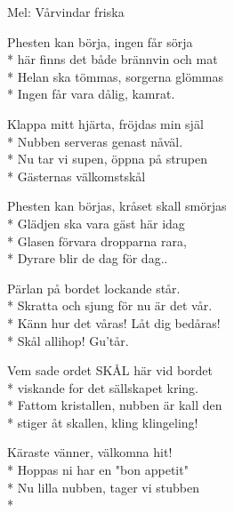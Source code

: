 \begin{SongText}
    \begin{SongInfo}
        Mel: Vårvindar friska
    \end{SongInfo}
    \begin{SongVerse}
        Phesten kan börja, ingen får sörja\\*%
        här finns det både brännvin och mat\\*%
        Helan ska tömmas, sorgerna glömmas\\*%
        Ingen får vara dålig, kamrat.
    \end{SongVerse}
    \begin{SongVerse}
        Klappa mitt hjärta, fröjdas min själ\\*%
        Nubben serveras genast nåväl.\\*%
        Nu tar vi supen, öppna på strupen\\*%
        Gästernas välkomstskål
    \end{SongVerse}
    \begin{SongVerse}
        Phesten kan börjas, kråset skall smörjas\\*%
        Glädjen ska vara gäst här idag\\*%
        Glasen förvara dropparna rara,\\*%
        Dyrare blir de dag för dag..
    \end{SongVerse}
    \begin{SongVerse}
        Pärlan på bordet lockande står.\\*%
        Skratta och sjung för nu är det vår.\\*%
        Känn hur det våras! Låt dig bedåras!\\*%
        Skål allihop! Gu’tår.
    \end{SongVerse}
    \begin{SongVerse}
        Vem sade ordet SKÅL här vid bordet\\*%
        viskande for det sällskapet kring.\\*%
        Fattom kristallen, nubben är kall den\\*%
        stiger åt skallen, kling klingeling!
    \end{SongVerse}
    \begin{SongVerse}
        Käraste vänner, välkomna hit!\\*%
        Hoppas ni har en "bon appetit"\\*%
        Nu lilla nubben, tager vi stubben\\*%

\end{SongVerse}
\end{SongText}
